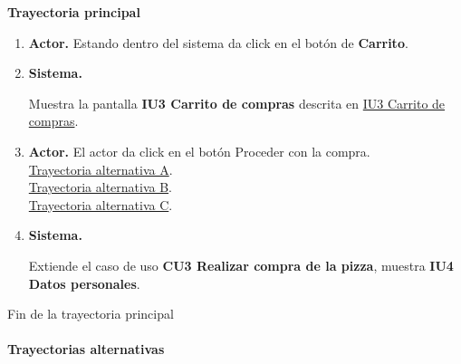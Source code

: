 \noindent \textbf{Trayectoria principal}

\begin{enumerate}
	
	\item {\textbf{Actor.}} Estando dentro del sistema da click en el botón de \textbf{Carrito}.
	
	\item \hypertarget{CU2:TP:P4}{\textbf{Sistema.}} Muestra la pantalla \textbf{IU3 Carrito de compras} descrita en \hyperlink{IU3}{IU3 Carrito de compras}.
	
	\item \textbf{Actor.} El actor da click en el botón  Proceder con la compra.
	\\ \hyperlink{CU2:TAA}{Trayectoria alternativa A}.
	\\ \hyperlink{CU2:TAB}{Trayectoria alternativa B}. 
	\\ \hyperlink{CU2:TAC}{Trayectoria alternativa C}. 
	
	\item \hypertarget{CU1:TP:P4}{\textbf{Sistema.}} Extiende el caso de uso \textbf{CU3 Realizar compra de la pizza}, muestra \textbf{IU4 Datos personales}.
	

\end{enumerate}	
Fin de la trayectoria principal
\\
\noindent \textbf{\\Trayectorias alternativas}

